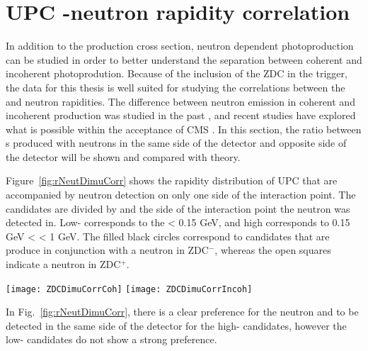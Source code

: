   \section{UPC \JPsi{}-neutron rapidity correlation~\label{sec:upcCor}}
    In addition to the production cross section, neutron dependent
      \JPsi{} photoproduction can be studied in order to better 
      understand the separation between coherent and incoherent photoprodution. 
    Because of the inclusion of the ZDC in the trigger, the data for this 
      thesis is well suited for studying the correlations between the 
      \JPsi{} and neutron rapidities. 
    The difference between neutron emission in coherent and incoherent 
      production was studied in the past \cite{Strikman:2005ze}, and recent
      studies have explored what is possible within the acceptance
      of CMS \cite{Guzey:2013jaa}. 
    In this section, the ratio between \JPsi{}s produced with neutrons in the 
      same side of the detector and opposite side of the detector will be shown
      and compared with theory. 

    Figure~\ref{fig:rNeutDimuCorr} shows the rapidity distribution of UPC 
      \JPsi{} that are accompanied by neutron detection on only one side of the
      interaction point. 
    The candidates are divided by \pt{} and the side of the interaction point
      the neutron was detected in. 
    Low-\pt{} corresponds to the \pt{} < 0.15 GeV, and high \pt{} corresponds
      to 0.15 GeV < \pt < 1 GeV.
    The filled black circles correspond to candidates that are produce in 
      conjunction with a neutron in ZDC$^{-}$, whereas the open squares 
      indicate a neutron in ZDC$^{+}$.
    \begin{figure*}[!Hhtb]
      \begin{center}
        \texttt{[image: ZDCDimuCorrCoh]}
        \texttt{[image: ZDCDimuCorrIncoh]}
        \caption{\label{fig:rNeutDimuCorr}Rapidity distribution of \JPsi{} in the
          case of the events having the neutron in negative and positive rapidity 
          for the low-\pt{} \JPsi{} (left), high-\pt{} \JPsi{} (right) and dimuons from
          $\gamma \gamma$ sample (bottom). }
      \end{center}
    \end{figure*}
    In Fig.~\ref{fig:rNeutDimuCorr}, there is a clear preference for the 
      neutron and \JPsi{} to be detected in the same side of the detector for
      the high-\pt{} candidates, however the low-\pt{} candidates do not show
      a strong preference. 

